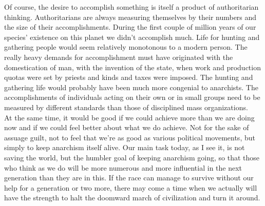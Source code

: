 Of course, the desire to accomplish something is itself a product of authoritarian thinking. Authoritarians are always measuring themselves by their numbers and the size of their accomplishments. During the first couple of million years of our species' existence on this planet we didn't accomplish much. Life for hunting and gathering people would seem relatively monotonous to a modern person. The really heavy demands for accomplishment must have originated with the domestication of man, with the invention of the state, when work and production quotas were set by priests and kinds and taxes were imposed. The hunting and gathering life would probably have been much more congenial to anarchists. The accomplishments of individuals acting on their own or in small groups need to be measured by different standards than those of disciplined mass organizations.\\
At the same time, it would be good if we could achieve more than we are doing now and if we could feel better about what we do achieve. Not for the sake of assuage guilt, not to feel that we're as good as various political movements, but simply to keep anarchism itself alive. Our main task today, as I see it, is not saving the world, but the humbler goal of keeping anarchism going, so that those who think as we do will be more numerous and more influential in the next generation than they are in this. If the race can manage to survive without our help for a generation or two more, there may come a time when we actually will have the strength to halt the doomward march of civilization and turn it around.\\
